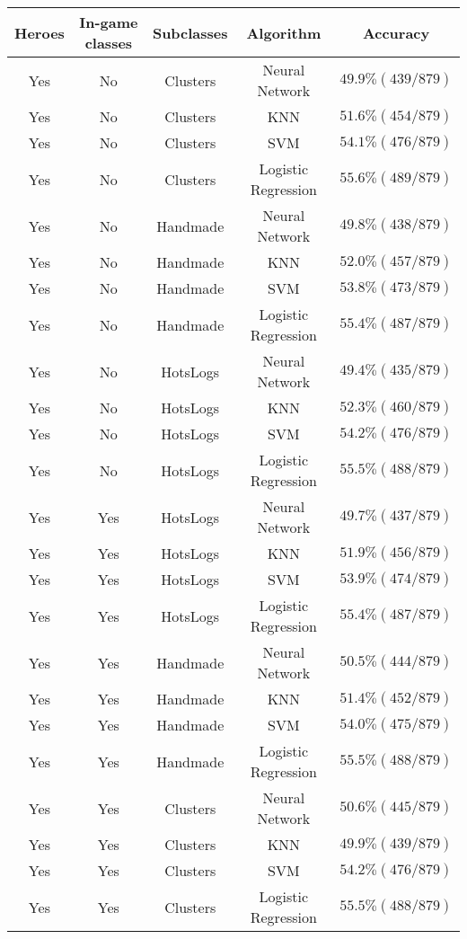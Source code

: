 \documentclass[11pt,letterpaper]{article}
\begin{document}
\noindent\begin{tabular}{c|c|c|c|c}
\textbf{Heroes} & \textbf{In-game classes} & \textbf{Subclasses} & \textbf{Algorithm} & \textbf{Accuracy} \\
\hline



Yes & No & Clusters & Neural Network & $49.9\% (439/879)$ \\
Yes & No & Clusters & KNN & $51.6\% (454/879)$ \\
Yes & No & Clusters& SVM & $54.1\% (476/879)$ \\
Yes & No & Clusters & Logistic Regression & $55.6\% (489/879)$ \\

Yes & No & Handmade & Neural Network & $49.8\% (438/879)$ \\
Yes & No & Handmade & KNN & $52.0\% (457/879)$ \\
Yes & No & Handmade & SVM & $53.8\% (473/879)$ \\
Yes & No & Handmade & Logistic Regression & $55.4\% (487/879)$ \\

Yes & No & HotsLogs & Neural Network & $49.4\% (435/879)$ \\
Yes & No & HotsLogs & KNN & $52.3\% (460/879)$ \\
Yes & No & HotsLogs & SVM & $54.2\% (476/879)$ \\
Yes & No & HotsLogs & Logistic Regression & $55.5\% (488/879)$ \\

Yes & Yes & HotsLogs & Neural Network & $49.7\% (437/879)$ \\
Yes & Yes & HotsLogs & KNN & $51.9\% (456/879)$ \\
Yes & Yes & HotsLogs & SVM & $53.9\% (474/879)$ \\
Yes & Yes & HotsLogs & Logistic Regression & $55.4\% (487/879)$ \\

Yes & Yes & Handmade & Neural Network & $50.5\% (444/879)$ \\
Yes & Yes & Handmade & KNN & $51.4\% (452/879)$ \\
Yes & Yes & Handmade & SVM & $54.0\% (475/879)$ \\
Yes & Yes & Handmade & Logistic Regression & $55.5\% (488/879)$ \\

Yes & Yes & Clusters & Neural Network & $50.6\% (445/879)$ \\
Yes & Yes &  Clusters & KNN & $49.9\% (439/879)$ \\
Yes & Yes &  Clusters & SVM & $54.2\% (476/879)$ \\
Yes & Yes &  Clusters & Logistic Regression & $55.5\% (488/879)$ \\


\end{tabular}
\end{document}
